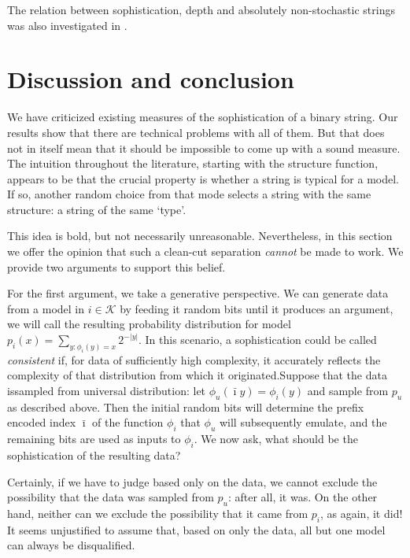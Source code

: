 \documentclass{style/llncs}
\newcommand{\K}{\mathscr K}
\begin{document}
The relation between sophistication, depth and absolutely non-stochastic strings was also investigated in \cite{antunes2013sophistication}.

\section{Discussion and conclusion}
\label{section:conclusion} 

We have criticized existing measures of the sophistication of a binary string. Our results show that there are technical problems with all of them. But that does not in itself mean that it should be impossible to come up with a sound measure. The intuition throughout the literature, starting with the structure function, appears to be that the crucial property is whether a string is typical for a model. If so, another random choice from that mode selects a string with the same structure: a string of the same `type'.

This idea is bold, but not necessarily unreasonable. Nevertheless, in this section we offer the opinion that such a clean-cut separation \emph{cannot} be made to work. We provide two arguments to support this belief.

For the first argument, we take a generative perspective. We can generate data from a model in $i \in \K$ by feeding it random bits until it produces an argument, we will call the resulting probability distribution for model $p_i(x) = \sum_{y:\phi_i(y) = x} 2^{-|y|}$. In this scenario, a sophistication could be called \emph{consistent} if, for data of sufficiently high complexity, it accurately reflects the complexity of that distribution from which it originated.\footnotemark Suppose that the data issampled from  universal distribution: let $\phi_u(\bar\imath y)=\phi_i(y)$ and sample from $p_u$ as described above. Then the initial random bits will determine the prefix encoded index $\bar\imath$ of the function $\phi_i$ that $\phi_u$ will subsequently emulate, and the remaining bits are used as inputs to $\phi_i$. We now ask, what should be the sophistication of the resulting data?


Certainly, if we have to judge based only on the data, we cannot exclude the possibility that the data was sampled from $p_u$: after all, it was.  On the other hand, neither can we exclude the possibility that it came from $p_i$, as again, it did! It seems unjustified to assume that, based on only the data, all but one model can always be disqualified.
\end{document}
